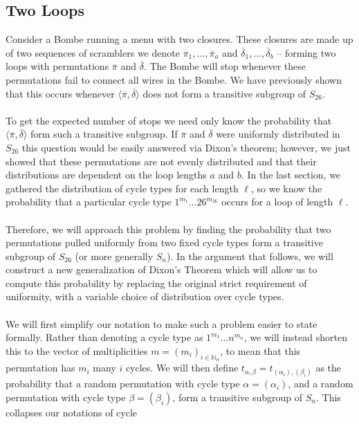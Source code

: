 \subsection{Two Loops}
Consider a Bombe running a menu with two closures. These closures are
made up of two sequences of scramblers we denote $\overline\pi_1,
\dots, \overline\pi_a$ and
$\overline\delta_1,\dots,\overline\delta_b$ -- forming two loops with
permutations $\overline\pi$ and $\overline\delta$. The Bombe will
stop whenever these permutations fail to connect all wires in the
Bombe. We have previously shown that this occurs whenever $\langle
\overline\pi, \overline\delta \rangle$ does not form a transitive
subgroup of $S_{26}$.
\\\\To get the expected number of stops we need only know the
probability that $\langle \overline\pi, \overline\delta \rangle$ form
such a transitive subgroup. If $\overline\pi$ and $\overline\delta$
were uniformly distributed in $S_{26}$ this question would be easily
answered via Dixon's theorem; however, we just showed that these
permutations are not evenly distributed and that their distributions are
dependent on the loop lengths $a$ and $b$. In the last section, we
gathered the distribution of cycle types for each length $\ell$, so we know the
probability that a particular cycle type $1^{m_1}\dots26^{m_{26}}$
occurs for a loop of length $\ell$.
\\\\Therefore, we will approach this problem by finding the
probability that two permutations pulled uniformly from two fixed
cycle types form a transitive subgroup of $S_{26}$ (or more generally $S_n$). In the argument that follows, we will construct a new generalization of Dixon's Theorem which will allow us to compute this probability by replacing the original strict requirement of uniformity, with a variable choice of distribution over cycle types. 
\\\\We will first simplify our notation to make such a problem easier
to state formally. Rather than denoting a cycle type as $1^{m_1}\dots
n^{m_{n}}$, we will instead shorten this to the vector of
multiplicities $m=(m_i)_{i\in\mathbb{N}_n}$, to mean
that this permutation has $m_i$ many $i$ cycles. We will then define
$t_{\alpha, \beta} =t_{(\alpha_i), (\beta_i)}$ as the probability
that a random permutation with cycle type $\alpha =(\alpha_i)$, and a
random permutation with cycle type $\beta = (\beta_i)$, form a
transitive subgroup of $S_n$. This collapses our notations of cycle
